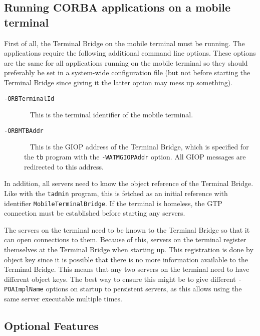 \documentclass[12pt,a4paper,draft]{article}
\begin{document}
\subsection{Running CORBA applications on a mobile terminal}

First of all, the Terminal Bridge on the mobile terminal must be
running.  The applications require the following additional command
line options.  These options are the same for all applications running
on the mobile terminal so they should preferably be set in a
system-wide configuration file (but not before starting the Terminal
Bridge since giving it the latter option may mess up something).

\begin{description}
\item[\texttt{-ORBTerminalId}] 
  ~\newline
  This is the terminal identifier of the mobile terminal.
\item[\texttt{-ORBMTBAddr}] 
  ~\newline
  This is the GIOP address of the Terminal Bridge, which is specified
  for the \texttt{tb} program with the \texttt{-WATMGIOPAddr} option.
  All GIOP messages are redirected to this address.
\end{description}

In addition, all servers need to know the object reference of the
Terminal Bridge.  Like with the \texttt{tadmin} program, this is
fetched as an initial reference with identifier
\texttt{MobileTerminalBridge}.  If the terminal is homeless, the GTP
connection must be established before starting any servers.

The servers on the terminal need to be known to the Terminal Bridge so
that it can open connections to them.  Because of this, servers on the
terminal register themselves at the Terminal Bridge when starting up.
This registration is done by object key since it is possible that
there is no more information available to the Terminal Bridge.  This
means that any two servers on the terminal need to have different
object keys.  The best way to ensure this might be to give different
\texttt{-POAImplName} options on startup to persistent servers, as
this allows using the same server executable multiple times.

\subsection{Optional Features}
\label{sec:opt}
\end{document}
